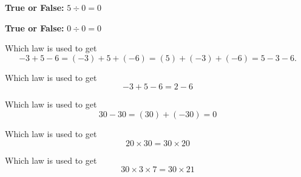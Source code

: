 \documentclass{ximera}
\begin{document}
\begin{problem}
\textbf{True or False:} $5\div 0= 0$ 
\begin{multipleChoice*}
\end{multipleChoice*}
\end{problem}


\begin{problem}
\textbf{True or False:} $0\div 0= 0$ 
\begin{multipleChoice*}
\end{multipleChoice*}
\end{problem}


\begin{problem}
Which law is used to get $$-3+5-6=(-3)+5+(-6)=(5)+(-3)+(-6)=5-3-6.$$ 
\begin{multipleChoice}
\end{multipleChoice}
\end{problem}


\begin{problem}
Which law is used to get $$-3+5-6=2-6$$ 
\begin{multipleChoice}
\end{multipleChoice}
\end{problem}


\begin{problem}
Which law is used to get $$30-30=(30)+(-30)=0$$ 
\begin{multipleChoice}
\end{multipleChoice}
\end{problem}


\begin{problem}
Which law is used to get $$20\times 30=30\times 20$$ 
\begin{multipleChoice}
\end{multipleChoice}
\end{problem}


\begin{problem}
Which law is used to get $$30\times 3 \times 7=30\times 21$$ 
\begin{multipleChoice}
\end{multipleChoice}
\end{problem}
\end{document}
